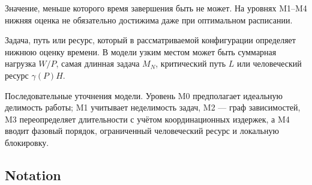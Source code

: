 \begin{description}[style=nextline]
  \item[Нижняя оценка времени] Значение, меньше которого время завершения быть
  не может. На уровнях M1--M4 нижняя оценка не обязательно достижима даже при
  оптимальном расписании.

  \item[Узкое место] Задача, путь или ресурс, который в рассматриваемой
  конфигурации определяет нижнюю оценку времени. В модели узким местом может
  быть суммарная нагрузка $W/P$, самая длинная задача $M_N$, критический путь
  $L$ или человеческий ресурс $\gamma(P)H$.

  \item[Уровни M0--M4] Последовательные уточнения модели. Уровень M0
  предполагает идеальную делимость работы; M1 учитывает неделимость задач, M2
  --- граф зависимостей, M3 переопределяет длительности с учётом
  координационных издержек, а M4 вводит фазовый порядок, ограниченный
  человеческий ресурс и локальную блокировку.
\end{description}

\subsection{Notation}

